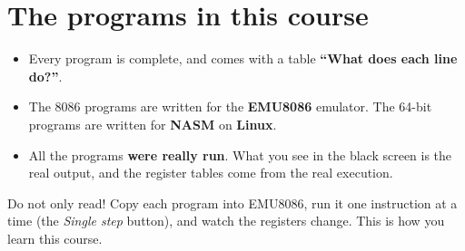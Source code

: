 \documentclass[11pt, a4paper, oneside]{report}
\begin{document}
\section*{The programs in this course}
\begin{itemize}
    \item Every program is complete, and comes with a table \textbf{``What does each line do?''}.
    \item The 8086 programs are written for the \textbf{EMU8086} emulator. The 64-bit programs are
          written for \textbf{NASM} on \textbf{Linux}.
    \item All the programs \textbf{were really run}. What you see in the black screen \faDesktop{} is the real output,
          and the register tables come from the real execution.
\end{itemize}

\begin{intabih}
    Do not only read! Copy each program into EMU8086, run it one instruction at a time
    (the \emph{Single step} button), and watch the registers change. This is how you learn this course.
\end{intabih}

\tableofcontents







\end{document}

